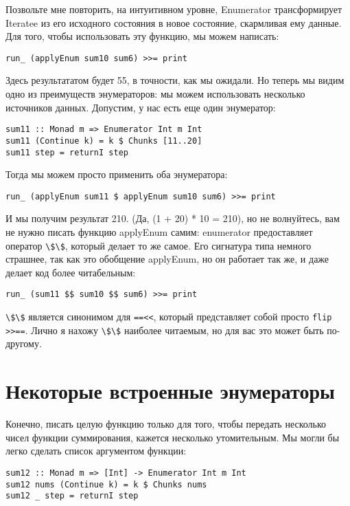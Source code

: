 Позвольте мне повторить, на интуитивном уровне, Enumerator трансформирует Iteratee из его исходного состояния в новое состояние, скармливая ему данные. Для того, чтобы использовать эту функцию, мы можем написать:

\begin{lstlisting}
run_ (applyEnum sum10 sum6) >>= print
\end{lstlisting}

Здесь результататом будет 55, в точности, как мы ожидали. Но теперь мы видим одно из преимуществ энумераторов: мы можем использовать несколько источников данных. Допустим, у нас есть еще один энумератор:

\begin{lstlisting}
sum11 :: Monad m => Enumerator Int m Int
sum11 (Continue k) = k $ Chunks [11..20]
sum11 step = returnI step
\end{lstlisting}%

Тогда мы можем просто применить оба энумератора:

\begin{lstlisting}
run_ (applyEnum sum11 $ applyEnum sum10 sum6) >>= print
\end{lstlisting}%

И мы получим результат 210. (Да, (1 + 20) * 10 = 210), но не волнуйтесь, вам не нужно писать функцию applyEnum самим: enumerator предоставляет оператор \lstinline'\$\$', который делает то же самое. Его сигнатура типа немного страшнее, так как это обобщение applyEnum, но он работает так же, и даже делает код более читабельным:

\begin{lstlisting}
run_ (sum11 $$ sum10 $$ sum6) >>= print
\end{lstlisting}%

\lstinline'\$\$' является синонимом для \lstinline'==<<', который представляет собой просто \lstinline'flip >>=='. Лично я нахожу \lstinline'\$\$' наиболее читаемым, но для вас это может быть по-другому.

\section{Некоторые встроенные энумераторы}

Конечно, писать целую функцию только для того, чтобы передать несколько чисел функции суммирования, кажется несколько утомительным. Мы могли бы легко сделать список аргументом функции:

\begin{lstlisting}
sum12 :: Monad m => [Int] -> Enumerator Int m Int
sum12 nums (Continue k) = k $ Chunks nums
sum12 _ step = returnI step
\end{lstlisting}%

